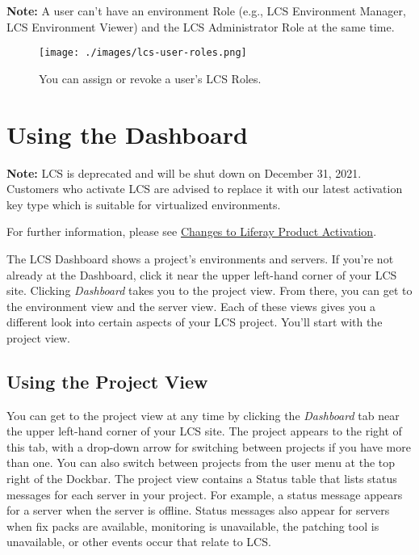 \noindent\hrulefill

\textbf{Note:} A user can't have an environment Role (e.g., LCS
Environment Manager, LCS Environment Viewer) and the LCS Administrator
Role at the same time.

\noindent\hrulefill

\begin{figure}
\centering
\texttt{[image: ./images/lcs-user-roles.png]}
\caption{You can assign or revoke a user's LCS Roles.}
\end{figure}

\chapter{Using the Dashboard}\label{using-the-dashboard}

\noindent\hrulefill

\textbf{Note:} LCS is deprecated and will be shut down on December 31,
2021. Customers who activate LCS are advised to replace it with our
latest activation key type which is suitable for virtualized
environments.

For further information, please see
\href{https://help.liferay.com/hc/en-us/articles/4402347960845-Changes-to-Liferay-Product-Activation}{Changes
to Liferay Product Activation}.

\noindent\hrulefill

The LCS Dashboard shows a project's environments and servers. If you're
not already at the Dashboard, click it near the upper left-hand corner
of your LCS site. Clicking \emph{Dashboard} takes you to the project
view. From there, you can get to the environment view and the server
view. Each of these views gives you a different look into certain
aspects of your LCS project. You'll start with the project view.

\section{Using the Project View}\label{using-the-project-view}

You can get to the project view at any time by clicking the
\emph{Dashboard} tab near the upper left-hand corner of your LCS site.
The project appears to the right of this tab, with a drop-down arrow for
switching between projects if you have more than one. You can also
switch between projects from the user menu at the top right of the
Dockbar. The project view contains a Status table that lists status
messages for each server in your project. For example, a status message
appears for a server when the server is offline. Status messages also
appear for servers when fix packs are available, monitoring is
unavailable, the patching tool is unavailable, or other events occur
that relate to LCS.

